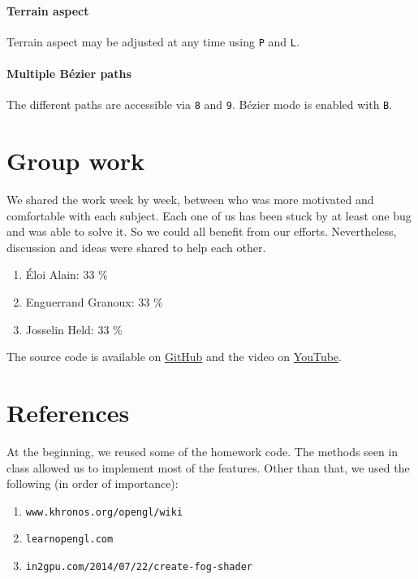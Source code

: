 \documentclass[12pt]{article}
\begin{document}
\paragraph{Terrain aspect} Terrain aspect may be adjusted at any time using \texttt{P} and \texttt{L}.

\paragraph{Multiple Bézier paths} The different paths are accessible via \texttt{8} and \texttt{9}. Bézier mode is enabled with \texttt{B}.


\section{Group work}

We shared the work week by week, between who was more motivated and comfortable with each subject. Each one of us has been stuck by at least one bug and was able to solve it. So we could all benefit from our efforts. Nevertheless, discussion and ideas were shared to help each other.

\begin{enumerate}
\item Éloi Alain: 33 \%
\item Enguerrand Granoux: 33 \%
\item Josselin Held: 33 \%
\end{enumerate}

The source code is available on \href{https://github.com/ealain}{GitHub} and the video on \href{https://youtu.be/c4cxYly9IRQ}{YouTube}.

\section{References}

At the beginning, we reused some of the homework code. The methods seen in class allowed us to implement most of the features. Other than that, we used the following (in order of importance):
\begin{enumerate}
\item {\tt www.khronos.org/opengl/wiki}
\item {\tt learnopengl.com}
\item {\tt in2gpu.com/2014/07/22/create-fog-shader}
\end{enumerate}
\end{document}

